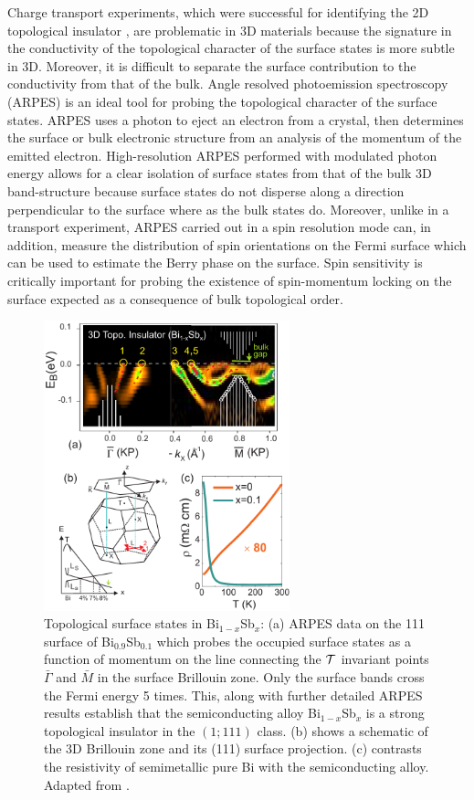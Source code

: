 \documentclass[twocolumn,floatfix,showpacs,rmp,aps]{revtex4}
\begin{document}
Charge transport experiments,
which were successful for identifying the 2D topological
insulator \cite{konig07}, are problematic in 3D materials because
the signature in the conductivity
of the topological character of the surface states is more subtle in 3D.
Moreover, it is difficult to separate the surface contribution to the conductivity
from that of the bulk.
Angle resolved photoemission spectroscopy (ARPES) is an ideal tool for probing
the topological character of the surface states.
ARPES uses a photon to eject an electron from a
crystal, then determines the surface or bulk electronic structure
from an analysis of the momentum of the emitted electron.
High-resolution ARPES performed with
modulated photon energy allows for a clear isolation of surface
states from that of the bulk 3D band-structure because surface states
do not disperse along a direction perpendicular to the surface where
as the bulk states do. Moreover, unlike in a transport experiment,
ARPES carried out in a spin resolution mode can, in addition, measure
the distribution of spin orientations on the Fermi surface which can
be used to estimate the Berry phase on the surface. Spin
sensitivity is critically important for probing the existence of
spin-momentum locking on the surface expected as a consequence of
bulk topological order.

\begin{figure}
\includegraphics[width=2.8in]{Fig9}%
\caption{Topological surface states in
Bi$_{1-x}$Sb$_{x}$:  (a) ARPES data on the 111 surface of
Bi$_{0.9}$Sb$_{0.1}$ which probes
the occupied surface states as a function of momentum on the line connecting
the ${\cal T}$ invariant points $\bar\Gamma$ and $\bar M$ in the surface Brillouin
zone.  Only the surface bands cross the Fermi energy 5 times.  This, along with
further detailed ARPES results \cite{hsieh08} establish that the semiconducting
alloy Bi$_{1-x}$Sb$_{x}$ is a strong topological insulator in the $(1;111)$
class.  (b) shows a schematic of the 3D Brillouin zone and its (111) surface
projection.  (c) contrasts the resistivity of semimetallic pure Bi with
the semiconducting alloy.  Adapted from .}
\label{fig:zfig1} \end{figure}
\end{document}
